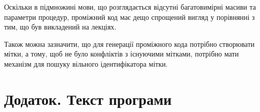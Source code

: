 \documentclass[a4paper,12pt,notitlepage,pdftex]{scrreprt}
\begin{document}
    Оскільки в підмножині мови, що розглядається відсутні багатовимірні масиви та параметри процедур, проміжний код
    має дещо спрощений вигляд у порівнянні з тим, що був викладений на лекціях.

    Також можна зазначити, що для генерації проміжного кода потрібно створювати мітки, а тому, щоб не було конфліктів
    з існуючими мітками, потрібно мати механізм для пошуку вільного ідентифікатора мітки.

\chapter*{Додаток. Текст програми}
    \lstset{language=C++,basicstyle=\scriptsize}
        
\end{document}
